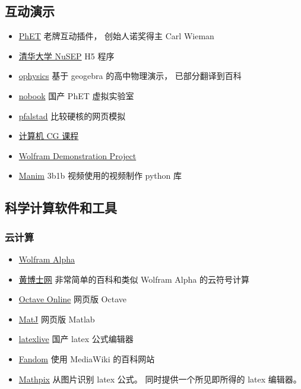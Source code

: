\subsection{互动演示}
\begin{itemize}
\item \href{https://phet.colorado.edu}{PhET} 老牌互动插件， 创始人诺奖得主 Carl Wieman
\item \href{http://nusep.phys.tsinghua.edu.cn/}{清华大学 NuSEP} H5 程序
\item \href{https://ophysics.com}{ophysics} 基于 geogebra 的高中物理演示， 已部分翻译到百科
\item \href{https://www.nobook.com}{nobook} 国产 PhET 虚拟实验室
\item \href{https://www.falstad.com}{pfalstad} 比较硬核的网页模拟
\item \href{http://www.cs.cornell.edu/courses/cs5643/2010sp}{计算机 CG 课程}
\item \href{https://demonstrations.wolfram.com/topics.php?PhysicalSciences#5}{Wolfram Demonstration Project}
\item \href{https://github.com/3b1b/manim}{Manim} 3b1b 视频使用的视频制作 python 库
\end{itemize}

\subsection{科学计算软件和工具}
\subsubsection{云计算}
\begin{itemize}
\item \href{https://www.wolframalpha.com/}{Wolfram Alpha}
\item \href{http://www.drhuang.com}{黄博士网} 非常简单的百科和类似 Wolfram Alpha 的云符号计算
\item \href{https://octave-online.net/}{Octave Online} 网页版 Octave
\item \href{https://uqs7z-qiaaa-aaaak-qacra-cai.raw.ic0.app/}{MatJ} 网页版 Matlab
\item \href{https://www.latexlive.com}{latexlive} 国产 latex 公式编辑器
\item \href{https://harrypotter.fandom.com}{Fandom} 使用 MediaWiki 的百科网站
\item \href{https://mathpix.com}{Mathpix} 从图片识别 latex 公式。 同时提供一个所见即所得的 latex 编辑器。
\end{itemize}


